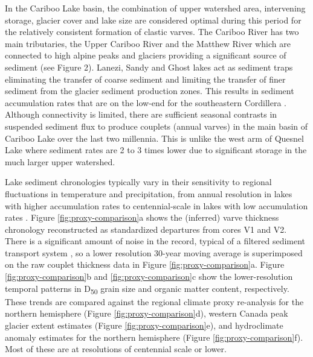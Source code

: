 \documentclass[Royal,times,doublespace,sageh]{sagej}
\begin{document}
In the Cariboo Lake basin, the combination of upper watershed area,
intervening storage, glacier cover and lake size are considered optimal
during this period for the relatively consistent formation of clastic
varves. The Cariboo River has two main tributaries, the Upper Cariboo
River and the Matthew River which are connected to high alpine peaks and
glaciers providing a significant source of sediment (see Figure 2).
Lanezi, Sandy and Ghost lakes act as sediment traps eliminating the
transfer of coarse sediment and limiting the transfer of finer sediment
from the glacier sediment production zones. This results in sediment
accumulation rates that are on the low-end for the southeastern
Cordillera \citep{Hodder2006b}. Although connectivity is limited, there
are sufficient seasonal contrasts in suspended sediment flux to produce
couplets (annual varves) in the main basin of Cariboo Lake over the last
two millennia. This is unlike the west arm of Quesnel Lake where
sediment rates are 2 to 3 times lower due to significant storage in the
much larger upper watershed.

Lake sediment chronologies typically vary in their sensitivity to
regional fluctuations in temperature and precipitation, from annual
resolution in lakes with higher accumulation rates
\citep[e.g.][]{Menounos2008c} to centennial-scale in lakes with low
accumulation rates \citep[e.g.][]{Desloges1999}. Figure
\ref{fig:proxy-comparison}a shows the (inferred) varve thickness
chronology reconstructed as standardized departures from cores V1 and
V2. There is a significant amount of noise in the record, typical of a
filtered sediment transport system \citep[e.g.][]{Jerolmack2010}, so a
lower resolution 30-year moving average is superimposed on the raw
couplet thickness data in Figure \ref{fig:proxy-comparison}a. Figure
\ref{fig:proxy-comparison}b and \ref{fig:proxy-comparison}c show the
lower-resolution temporal patterns in D\textsubscript{50} grain size and
organic matter content, respectively. These trends are compared against
the \citet{Moberg2005} regional climate proxy re-analysis for the
northern hemisphere (Figure \ref{fig:proxy-comparison}d),
\citet{Solomina2016} western Canada peak glacier extent estimates
(Figure \ref{fig:proxy-comparison}e), and \citet{Ljungqvist2016}
hydroclimate anomaly estimates for the northern hemisphere (Figure
\ref{fig:proxy-comparison}f). Most of these are at resolutions of
centennial scale or lower.
\end{document}
